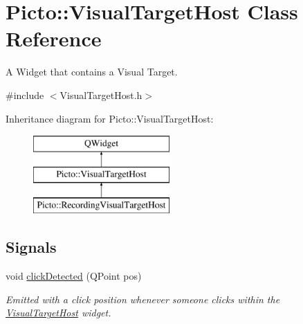 \hypertarget{class_picto_1_1_visual_target_host}{\section{Picto\-:\-:Visual\-Target\-Host Class Reference}
\label{class_picto_1_1_visual_target_host}
}


A Widget that contains a Visual Target.  




{\ttfamily \#include $<$Visual\-Target\-Host.\-h$>$}

Inheritance diagram for Picto\-:\-:Visual\-Target\-Host\-:\begin{figure}[H]
\begin{center}
\leavevmode
\includegraphics[height=3.000000cm]{class_picto_1_1_visual_target_host}
\end{center}
\end{figure}
\subsection*{Signals}
\begin{DoxyCompactItemize}
\item 
\hypertarget{class_picto_1_1_visual_target_host_a3bfbf7373ba441163867709b42f84b69}{void \hyperlink{class_picto_1_1_visual_target_host_a3bfbf7373ba441163867709b42f84b69}{click\-Detected} (Q\-Point pos)}\label{class_picto_1_1_visual_target_host_a3bfbf7373ba441163867709b42f84b69}

\begin{DoxyCompactList}\small\item\em Emitted with a click position whenever someone clicks within the \hyperlink{class_picto_1_1_visual_target_host}{Visual\-Target\-Host} widget. \end{DoxyCompactList}\end{DoxyCompactItemize}
